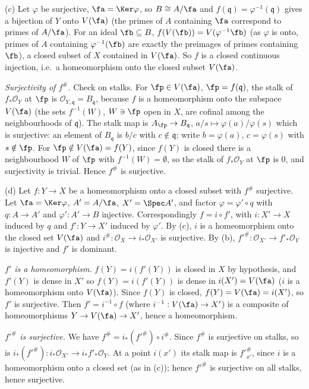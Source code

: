 \documentclass[11pt]{article}
\begin{document}
(c) Let $\varphi$ be surjective, $\fa=\Ker\varphi$, so $B\cong A/\fa$ and $f(\mathfrak q)=\varphi^{-1}(\mathfrak q)$ gives a bijection of $Y$ onto $V(\fa)$ (the primes of $A$ containing $\fa$ correspond to primes of $A/\fa$). For an ideal $\fb\subseteq B$, $f(V(\fb))=V(\varphi^{-1}\fb)$ (as $\varphi$ is onto, primes of $A$ containing $\varphi^{-1}(\fb)$ are exactly the preimages of primes containing $\fb$), a closed subset of $X$ contained in $V(\fa)$. So $f$ is a closed continuous injection, i.e.\ a homeomorphism onto the closed subset $V(\fa)$.

\emph{Surjectivity of $f^\#$.} Check on stalks. For $\fp\in V(\fa)$, $\fp=f(\mathfrak q)$, the stalk of $f_*\mathcal O_Y$ at $\fp$ is $\mathcal O_{Y,\mathfrak q}=B_{\mathfrak q}$, because $f$ is a homeomorphism onto the subspace $V(\fa)$ (the sets $f^{-1}(W)$, $W\ni\fp$ open in $X$, are cofinal among the neighbourhoods of $\mathfrak q$). The stalk map is $A_\fp\to B_{\mathfrak q}$, $a/s\mapsto\varphi(a)/\varphi(s)$ which is surjective: an element of $B_{\mathfrak q}$ is $b/c$ with $c\notin\mathfrak q$; write $b=\varphi(a)$, $c=\varphi(s)$ with $s\notin\fp$. For $\fp\notin V(\fa)=f(Y)$, since $f(Y)$ is closed there is a neighbourhood $W$ of $\fp$ with $f^{-1}(W)=\emptyset$, so the stalk of $f_*\mathcal O_Y$ at $\fp$ is $0$, and surjectivity is trivial. Hence $f^\#$ is surjective.

(d) Let $f:Y\to X$ be a homeomorphism onto a closed subset with $f^\#$ surjective. Let $\fa=\Ker\varphi$, $A'=A/\fa$, $X'=\Spec A'$, and factor $\varphi=\varphi'\circ q$ with $q:A\to A'$ and $\varphi':A'\to B$ injective. Correspondingly $f=i\circ f'$, with $i:X'\to X$ induced by $q$ and $f':Y\to X'$ induced by $\varphi'$. By (c), $i$ is a homeomorphism onto the closed set $V(\fa)$ and $i^\#:\mathcal O_X\to i_*\mathcal O_{X'}$ is surjective. By (b), $f'^\#:\mathcal O_{X'}\to f'_*\mathcal O_Y$ is injective and $f'$ is dominant.

\emph{$f'$ is a homeomorphism.} $f(Y)=i(f'(Y))$ is closed in $X$ by hypothesis, and $f'(Y)$ is dense in $X'$ so $f(Y)=i(f'(Y))$ is dense in $i(X')=V(\fa)$ ($i$ is a homeomorphism onto $V(\fa)$). Since $f(Y)$ is closed, $f(Y)=V(\fa)=i(X')$, so $f'$ is surjective. Then $f'=i^{-1}\circ f$ (where $i^{-1}:V(\fa)\to X'$) is a composite of homeomorphisms $Y\to V(\fa)\to X'$, hence a homeomorphism.

\emph{$f'^\#$ is surjective.} We have $f^\#=i_*(f'^\#)\circ i^\#$. Since $f^\#$ is surjective on stalks, so is $i_*(f'^\#):i_*\mathcal O_{X'}\to i_*f'_*\mathcal O_Y$. At a point $i(x')$ its stalk map is $f'^\#_{x'}$, since $i$ is a homeomorphism onto a closed set (as in (c)); hence $f'^\#$ is surjective on all stalks, hence surjective.
\end{document}
